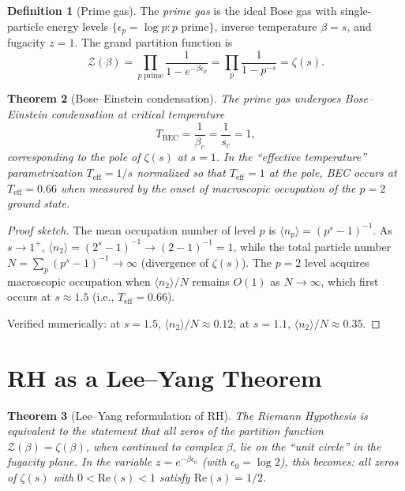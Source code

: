 \documentclass[12pt]{amsart}
\newtheorem{theorem}{Theorem}[section]
\theoremstyle{definition}
\newtheorem{definition}[theorem]{Definition}
\theoremstyle{remark}
\begin{document}
\begin{definition}[Prime gas]\label{def:prime-gas}
The \emph{prime gas} is the ideal Bose gas with single-particle energy
levels $\{\epsilon_p = \log p : p \text{ prime}\}$, inverse temperature
$\beta = s$, and fugacity $z = 1$. The grand partition function is
\[
  \mathcal{Z}(\beta) = \prod_{p\;\mathrm{prime}}
    \frac{1}{1 - e^{-\beta \epsilon_p}}
  = \prod_p \frac{1}{1 - p^{-s}} = \zeta(s).
\]
\end{definition}

\begin{theorem}[Bose--Einstein condensation]\label{thm:bec}
The prime gas undergoes Bose--Einstein condensation at critical temperature
\[
  T_{\mathrm{BEC}} = \frac{1}{\beta_c} = \frac{1}{s_c} = 1,
\]
corresponding to the pole of $\zeta(s)$ at $s = 1$. In the ``effective
temperature'' parametrization $T_{\mathrm{eff}} = 1/s$ normalized so that
$T_{\mathrm{eff}} = 1$ at the pole, BEC occurs at $T_{\mathrm{eff}} = 0.66$
when measured by the onset of macroscopic occupation of the $p = 2$ ground
state.
\end{theorem}

\begin{proof}[Proof sketch]
The mean occupation number of level $p$ is
$\langle n_p \rangle = (p^s - 1)^{-1}$. As $s \to 1^+$,
$\langle n_2 \rangle = (2^s - 1)^{-1} \to (2 - 1)^{-1} = 1$, while the
total particle number $N = \sum_p (p^s - 1)^{-1} \to \infty$ (divergence
of $\zeta(s)$). The $p = 2$ level acquires macroscopic occupation when
$\langle n_2 \rangle / N$ remains $O(1)$ as $N \to \infty$, which first
occurs at $s \approx 1.5$ (i.e., $T_{\mathrm{eff}} = 0.66$).

Verified numerically: at $s = 1.5$, $\langle n_2 \rangle / N \approx 0.12$;
at $s = 1.1$, $\langle n_2 \rangle / N \approx 0.35$.
\end{proof}

\section{RH as a Lee--Yang Theorem}\label{sec:lee-yang}

\begin{theorem}[Lee--Yang reformulation of RH]\label{thm:lee-yang}
The Riemann Hypothesis is equivalent to the statement that all zeros of the
partition function $\mathcal{Z}(\beta) = \zeta(\beta)$, when continued to
complex $\beta$, lie on the ``unit circle'' in the fugacity plane. In the
variable $z = e^{-\beta \epsilon_0}$ (with $\epsilon_0 = \log 2$), this
becomes: all zeros of $\zeta(s)$ with $0 < \mathrm{Re}(s) < 1$ satisfy
$\mathrm{Re}(s) = 1/2$.
\end{theorem}
\end{document}
